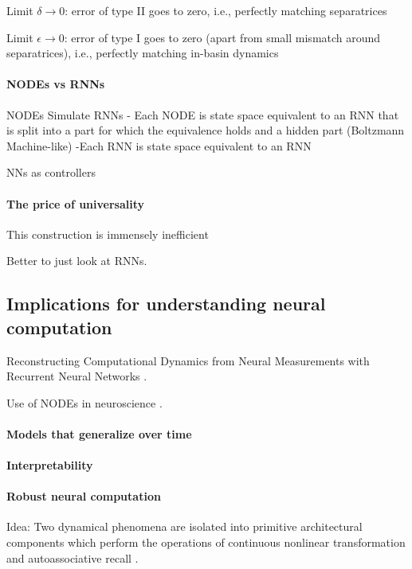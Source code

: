 \documentclass{article}
\theoremstyle{definition}
\theoremstyle{remark}
\newcounter{ct}
\begin{document}
Limit $\delta\rightarrow 0$: error of type II goes to zero, i.e., perfectly matching separatrices


Limit $\epsilon\rightarrow 0$: error of type I goes to zero (apart from small mismatch around separatrices), i.e., perfectly matching in-basin dynamics


\paragraph{NODEs vs RNNs}
NODEs Simulate RNNs 
- Each NODE is state space equivalent to an RNN that is split into a part for which the equivalence holds and a hidden part (Boltzmann Machine-like)
-Each RNN is state space equivalent to an RNN



NNs as controllers \citep{sontag1992neural}


\paragraph{The price of universality}
This construction is immensely inefficient

Better to just look at RNNs. 


\subsection{Implications for understanding neural computation} 

Reconstructing Computational Dynamics from Neural Measurements with Recurrent Neural Networks \citep{durstewitz2023reconstructing}.

Use of NODEs in neuroscience \citep{kim2021inferring}.


\paragraph{Models that generalize over time}


\paragraph{Interpretability}%


\paragraph{Robust neural computation}
Idea: Two dynamical phenomena are isolated into primitive architectural components which perform the operations of continuous nonlinear transformation and autoassociative recall \citep{pineda1988dynamics}.
\end{document}
